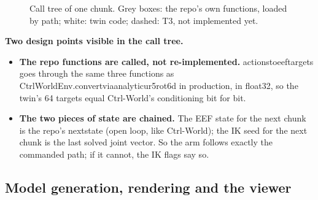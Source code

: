 \documentclass[11pt,a4paper]{article}
\newcommand{\code}[1]{{\small\ttfamily\begingroup\def\_{\textunderscore\allowbreak}\def\/{/\allowbreak}#1\endgroup}}
\begin{document}
\begin{figure}[p]
\caption{Call tree of one chunk. Grey boxes: the repo's own functions, loaded by path; white: twin code; dashed: T3, not implemented yet.}
\label{fig:chunkflow}
\end{figure}

\textbf{Two design points visible in the call tree.}
\begin{itemize}
\item \textbf{The repo functions are called, not re-implemented.} \code{actions\_to\_eef\_targets} goes through the same three functions as \code{CtrlWorldEnv.\_convert\_via\_analytic\_ur5\_rot6d} in production, in float32, so the twin's 64 targets equal Ctrl-World's conditioning bit for bit.
\item \textbf{The two pieces of state are chained.} The EEF state for the next chunk is the repo's \code{next\_state} (open loop, like Ctrl-World); the IK seed for the next chunk is the last solved joint vector. So the arm follows exactly the commanded path; if it cannot, the IK flags say so.
\end{itemize}

\subsection{Model generation, rendering and the viewer}\label{sec:renderflow}
\end{document}
